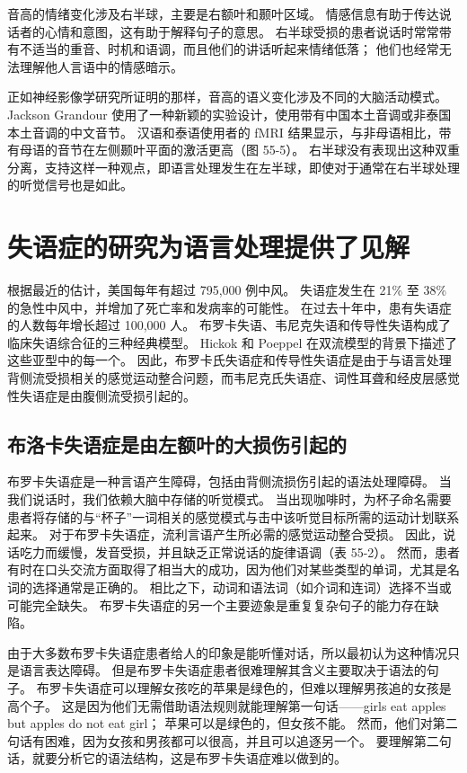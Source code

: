 音高的情绪变化涉及右半球，主要是右额叶和颞叶区域。 情感信息有助于传达说话者的心情和意图，这有助于解释句子的意思。 右半球受损的患者说话时常常带有不适当的重音、时机和语调，而且他们的讲话听起来情绪低落； 他们也经常无法理解他人言语中的情感暗示。

正如神经影像学研究所证明的那样，音高的语义变化涉及不同的大脑活动模式。 Jackson Grandour 使用了一种新颖的实验设计，使用带有中国本土音调或非泰国本土音调的中文音节。 汉语和泰语使用者的 fMRI 结果显示，与非母语相比，带有母语的音节在左侧颞叶平面的激活更高（图 55-5）。 右半球没有表现出这种双重分离，支持这样一种观点，即语言处理发生在左半球，即使对于通常在右半球处理的听觉信号也是如此。


\section{失语症的研究为语言处理提供了见解}
根据最近的估计，美国每年有超过 795,000 例中风。 失语症发生在 21\% 至 38\% 的急性中风中，并增加了死亡率和发病率的可能性。 在过去十年中，患有失语症的人数每年增长超过 100,000 人。 布罗卡失语、韦尼克失语和传导性失语构成了临床失语综合征的三种经典模型。 Hickok 和 Poeppel 在双流模型的背景下描述了这些亚型中的每一个。 因此，布罗卡氏失语症和传导性失语症是由于与语言处理背侧流受损相关的感觉运动整合问题，而韦尼克氏失语症、词性耳聋和经皮层感觉性失语症是由腹侧流受损引起的。

\subsection{布洛卡失语症是由左额叶的大损伤引起的}
布罗卡失语症是一种言语产生障碍，包括由背侧流损伤引起的语法处理障碍。 当我们说话时，我们依赖大脑中存储的听觉模式。 当出现咖啡时，为杯子命名需要患者将存储的与“杯子”一词相关的感觉模式与击中该听觉目标所需的运动计划联系起来。 对于布罗卡失语症，流利言语产生所必需的感觉运动整合受损。 因此，说话吃力而缓慢，发音受损，并且缺乏正常说话的旋律语调（表 55-2）。 然而，患者有时在口头交流方面取得了相当大的成功，因为他们对某些类型的单词，尤其是名词的选择通常是正确的。 相比之下，动词和语法词（如介词和连词）选择不当或可能完全缺失。 布罗卡失语症的另一个主要迹象是重复复杂句子的能力存在缺陷。

由于大多数布罗卡失语症患者给人的印象是能听懂对话，所以最初认为这种情况只是语言表达障碍。 但是布罗卡失语症患者很难理解其含义主要取决于语法的句子。 布罗卡失语症可以理解女孩吃的苹果是绿色的，但难以理解男孩追的女孩是高个子。 这是因为他们无需借助语法规则就能理解第一句话——girls eat apples but apples do not eat girl； 苹果可以是绿色的，但女孩不能。 然而，他们对第二句话有困难，因为女孩和男孩都可以很高，并且可以追逐另一个。 要理解第二句话，就要分析它的语法结构，这是布罗卡失语症难以做到的。

